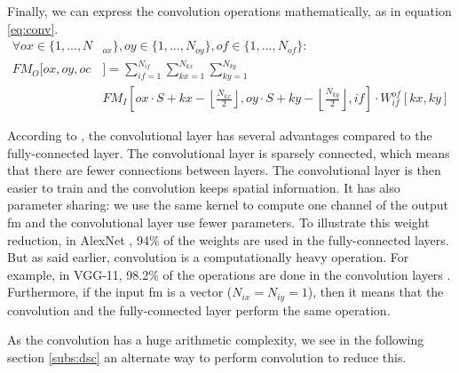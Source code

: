 Finally, we can express the convolution operations mathematically, as in equation \eqref{eq:conv}.
%
{\small
\begin{equation}
    \begin{split}
        \forall ox \in \{ 1, ..., N&_{ox} \}, oy \in \{ 1, ..., N_{oy} \}, of \in \{ 1, ..., N_{of} \}: \\
        FM_O[ox, oy, oc&] = \sum^{N_{if}}_{if=1}
        \sum^{N_{kx}}_{kx=1}
        \sum^{N_{ky}}_{ky=1}\\
        & FM_I \left[ ox \cdot S + kx - \left\lfloor \frac{N_{kx}}{2} \right\rfloor,  oy \cdot S + ky - \left\lfloor \frac{N_{ky}}{2} \right\rfloor, if \right] \cdot
        W^{of}_{if} \left[ kx, ky \right]
    \end{split}
    \label{eq:conv}
\end{equation}
}

According to \textcite{goodfellow_deep_2016}, the convolutional layer has several advantages compared to the fully-connected layer. The convolutional layer is sparsely connected, which means that there are fewer connections between layers. The convolutional layer is then easier to train and the convolution keeps spatial information. It has also parameter sharing: we use the same kernel to compute one channel of the output \acrshort{fm} and the convolutional layer use fewer parameters. To illustrate this weight reduction, in AlexNet \cite{krizhevsky_imagenet_2012}, 94\% of the weights are used in the fully-connected layers. But as said earlier, convolution is a computationally heavy operation. For example, in VGG-11, 98.2\% of the operations are done in the convolution layers \cite{guo_survey_2018}. Furthermore, if the input \acrshort{fm} is a vector ($N_{ix} = N_{iy} = 1$), then it means that the convolution and the fully-connected layer perform the same operation.

As the convolution has a huge arithmetic complexity, we see in the following section \ref{subs:dsc} an alternate way to perform convolution to reduce this.
